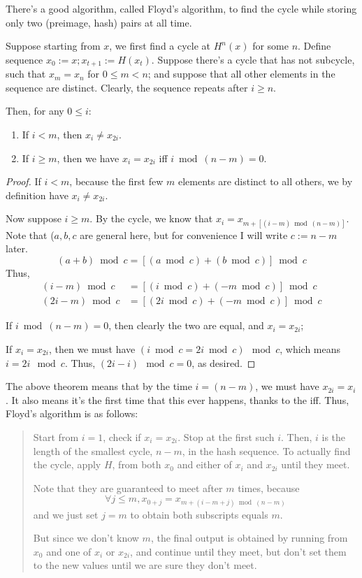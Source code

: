 \documentclass{6160}
\begin{document}
There's a good algorithm, called Floyd's algorithm, to find the cycle while
storing only two (preimage, hash) pairs at all time. 
\begin{theorem}
Suppose starting from $x$, we first find a cycle at $H^n(x)$ for some $n$.
Define sequence $x_0 := x; x_{t+1} := H(x_t)$. Suppose there's a cycle that has
not subcycle, such that $x_m = x_n$ for $0 \le m < n$; and suppose that all
other elements in the sequence are distinct. Clearly, the sequence repeats after
$i \ge n$.

Then, for any $0 \le i$:
\begin{enumerate}
	\item If $i < m$, then $x_i \ne x_{2i}$.
	\item If $i \ge m$, then we have $x_i = x_{2i}$ iff $i \bmod (n-m) = 0$.
\end{enumerate}
\end{theorem}
\begin{proof}
If $i < m$, because the first few $m$ elements are distinct to all others, we by
definition have $x_i \ne x_{2i}$.

Now suppose $i \ge m$. By the cycle, we know that $x_{i} = x_{m + [(i-m) \bmod
(n-m)]}$.
Note that ($a,b,c$ are general here, but for convenience I will write $c := n-m$
later.
\[
	(a+b) \bmod c = [(a \bmod c) + (b \bmod c)] \bmod c
\]	
Thus,
\begin{align*}
	(i-m) \bmod c &= [(i \bmod c) + (-m \bmod c)] \bmod c \\
	(2i-m) \bmod c &= [(2i \bmod c) + (-m \bmod c)] \bmod c 
\end{align*}

If $i \bmod (n-m) = 0$, then clearly the two are equal, and $x_i = x_{2i}$;

If $x_i = x_{2i}$, then we must have $(i \bmod c = 2i \bmod c) \mod c$, which
means $i = 2i \mod c$. Thus, $(2i-i) \mod c = 0$, as desired.
\end{proof}

The above theorem means that by the time $i = (n-m)$, we must have $x_{2i} =
x_i$. It also means it's the first time that this ever happens, thanks to the
iff. Thus, Floyd's algorithm is as follows:
\begin{quotation}
	Start from $i = 1$, check if $x_i = x_{2i}$. Stop at the first such $i$.
	Then, $i$ is the length of the smallest cycle, $n-m$, in the hash sequence. To
	actually find the cycle, apply $H$, from both $x_0$ and either of $x_i$ and
	$x_{2i}$ until they meet. 

	Note that they are guaranteed to meet after $m$ times, because
	\[
		\forall j \le m, x_{0+j} = x_{m + (i-m+j) \bmod (n-m)}
	\]
	and we just set $j = m$ to obtain both subscripts equals $m$.

	But since we don't know $m$, the final output is obtained by running from
	$x_0$ and one of $x_i$ or $x_{2i}$, and continue until they meet, but don't
	set them to the new values until we are sure they don't meet.
\end{quotation}
\end{document}
